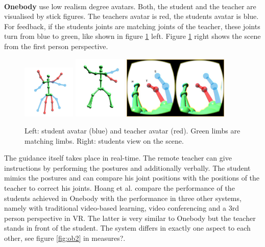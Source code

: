 $ $\\
\textbf{Onebody} \cite{Hoang2016} use low realism degree avatars. Both, the student and the teacher are visualised by stick figures. The teachers avatar is red, the students avatar is blue. For feedback, if the students joints are matching joints of the teacher, these joints turn from blue to green, like shown in figure \ref{fig:ob1} left. Figure \ref{fig:ob1} right shows the scene from the first person perspective.
\begin{figure}
	\centering
	\includegraphics[width=0.225\textwidth]{img/onebody1.png}
	\includegraphics[width=0.225\textwidth]{img/onebody2.png}
	\includegraphics[width=0.45\textwidth]{img/onebody3.png}
	\caption{Left: student avatar (blue) and teacher avatar (red). Green limbs are matching limbs. Right: students view on the scene.\cite{Hoang2016}}
	\label{fig:ob1}
\end{figure}
The guidance itself takes place in real-time. The remote teacher can give instructions by performing the postures and additionally verbally. The student mimics the postures and can compare his joint positions with the positions of the teacher to correct his joints. Hoang et al. compare the performance of the students achieved in Onebody with the performance in three other systems, namely with traditional video-based learning, video conferencing and a 3rd person perspective in VR. The latter is very similar to Onebody but the teacher stands in front of the student. The system differs in exactly one aspect to each other, see figure \ref{fig:ob2} \todo in measures?.
